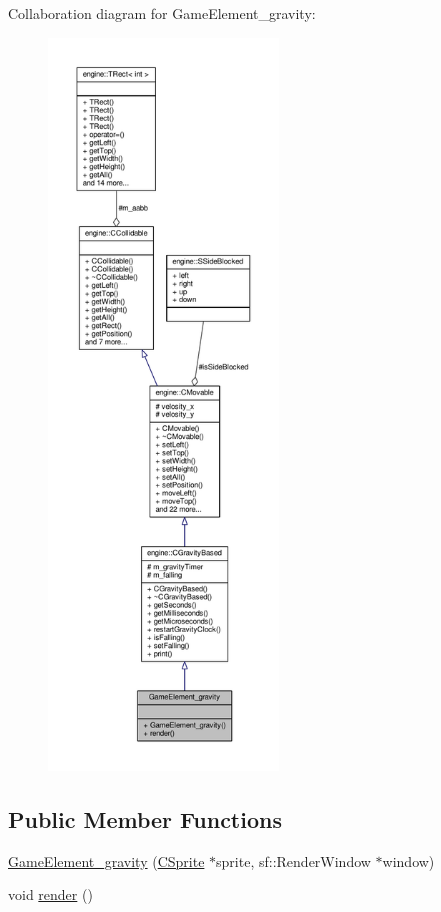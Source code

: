 Collaboration diagram for Game\-Element\-\_\-gravity\-:
\nopagebreak
\begin{figure}[H]
\begin{center}
\leavevmode
\includegraphics[height=550pt]{classGameElement__gravity__coll__graph}
\end{center}
\end{figure}
\subsection*{Public Member Functions}
\begin{DoxyCompactItemize}
\item 
\hyperlink{classGameElement__gravity_abe7ee1a61b9250149bf93fb589e4fcfe}{Game\-Element\-\_\-gravity} (\hyperlink{classCSprite}{C\-Sprite} $\ast$sprite, sf\-::\-Render\-Window $\ast$window)
\item 
void \hyperlink{classGameElement__gravity_a78dcd87b6096dbd621a7707cdef26550}{render} ()
\end{DoxyCompactItemize}
